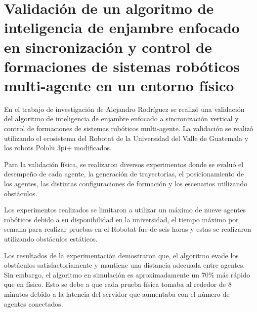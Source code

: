 \section{Validación de un algoritmo de inteligencia de enjambre enfocado en sincronización y control de formaciones de sistemas robóticos multi-agente en un entorno físico}
En el trabajo de investigación de Alejandro Rodríguez \cite{RodriguezJA_2023_tesis}se realizó una validación del algoritmo de inteligencia de enjambre enfocado a sincronización vertical y control de formaciones de sistemas robóticos multi-agente. La validación se realizó utilizando el ecosistema del Robotat de la Universidad del Valle de Guatemala y los robots Pololu 3pi+ modificados.

Para la validación física, se realizaron diversos experimentos donde se evaluó el desempeño de cada agente, la generación de trayectorias, el posicionamiento de los agentes, las distintas configuraciones de formación y los escenarios utilizando obstáculos.

Los experimentos realizados se limitaron a utilizar un máximo de nueve agentes robóticos debido a su disponibilidad en la universidad, el tiempo máximo por semana para realizar pruebas en el Robotat fue de seis horas y estas se realizaron utilizando obstáculos estáticos.

Los resultados de la experimentación demostraron que, el algoritmo evade los obstáculos satisfactoriamente y mantiene una distancia adecuada entre agentes. Sin embargo, el algoritmo en simulación es aproximadamente un 70\% más rápido que en físico. Esto se debe a que cada prueba física tomaba al rededor de 8 minutos debido a la latencia del servidor que aumentaba con el número de agentes conectados. 


